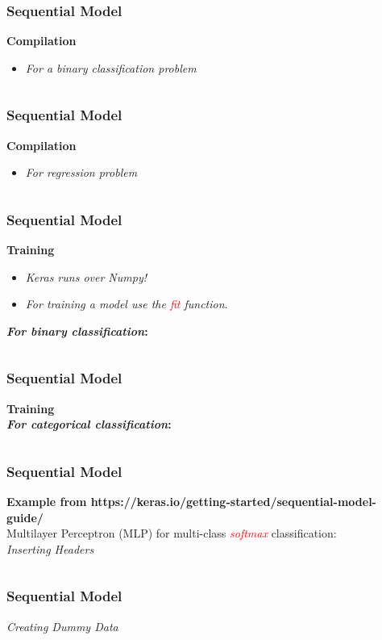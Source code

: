 \documentclass[aspectratio=169]{beamer}
\begin{document}
\begin{frame}
\frametitle{Sequential Model}
\textbf{Compilation}
\\[0.5cm]
\begin{itemize}
\item \textit{For a binary classification problem}
\inputminted{python}{./aux_files/three.py}
\end{itemize}
\end{frame}

\begin{frame}
\frametitle{Sequential Model}
\textbf{Compilation}
\\[0.5cm]
\begin{itemize}
\item \textit{For regression  problem}
\inputminted{python}{./aux_files/four.py}
\end{itemize}
\end{frame}

\begin{frame}
\frametitle{Sequential Model}
\textbf{Training}
\\[0.1cm]
\begin{itemize}
\item \textit{Keras runs over Numpy!}
\item \textit{For training a model use the \textcolor{red}{fit} function}.
\end{itemize}
\textbf{\textit{For binary classification}:}
\inputminted{python}{./aux_files/six.py}
\end{frame}

\begin{frame}
\frametitle{Sequential Model}
\textbf{Training}
\\[0.5cm]
\textbf{\textit{For categorical classification}:}
\inputminted{python}{./aux_files/seven.py}
\end{frame}

\begin{frame}
\frametitle{Sequential Model}
\textbf{Example from https://keras.io/getting-started/sequential-model-guide/}
\\[0.3cm]
Multilayer Perceptron (MLP) for multi-class \textit{\textcolor{red}{softmax}} classification:
\\[0.3cm]
\textit{Inserting Headers}
\inputminted{python}{./aux_files/eight.py}
\end{frame}

\begin{frame}
\frametitle{Sequential Model}
\textit{Creating Dummy Data}
\inputminted{python}{./aux_files/nine.py}
\end{frame}
\end{document}
